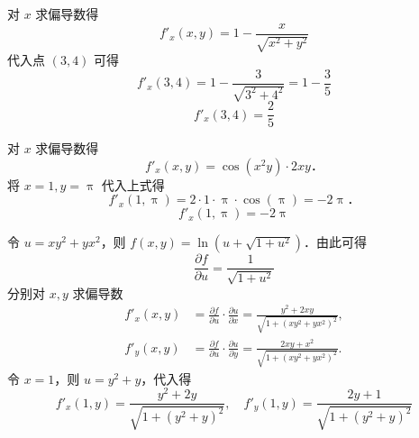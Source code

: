 \begin{solution}

    对 $x$ 求偏导数得
    \begin{equation}
        f'_x(x, y) = 1 - \frac{x}{\sqrt{x^2 + y^2}}
    \end{equation}
    代入点 $(3,4)$ 可得
    \begin{equation}
        f'_x(3,4) = 1 - \frac{3}{\sqrt{3^2 + 4^2}} = 1 - \frac{3}{5}
    \end{equation}
    \begin{equation}
        \boxed{f'_x(3,4) = \frac{2}{5}}
    \end{equation}


    对 $x$ 求偏导数得
    \begin{equation}
        f'_x(x, y) = \cos(x^2 y) \cdot 2xy．
    \end{equation}
    将 $x=1, y=\uppi$ 代入上式得
    \begin{equation}
        f'_x(1, \uppi) = 2 \cdot 1 \cdot \uppi \cdot \cos(\uppi) = -2\uppi．
    \end{equation}
    \begin{equation}
        \boxed{f'_x(1, \uppi) = -2\uppi}
    \end{equation}


    令 $u = xy^2 + yx^2$，则 $f(x,y) = \ln(u + \sqrt{1 + u^2})$．由此可得
    \begin{equation}
        \frac{\partial f}{\partial u} = \frac{1}{\sqrt{1 + u^2}}
    \end{equation}
    分别对 $x, y$ 求偏导数
    \begin{equation}
        \begin{aligned}
            f'_x(x, y) & = \frac{\partial f}{\partial u} \cdot \frac{\partial u}{\partial x} = \frac{y^2 + 2xy}{\sqrt{1 + (xy^2 + yx^2)^2}}, \\
            f'_y(x, y) & = \frac{\partial f}{\partial u} \cdot \frac{\partial u}{\partial y} = \frac{2xy + x^2}{\sqrt{1 + (xy^2 + yx^2)^2}}.
        \end{aligned}
    \end{equation}
    令 $x=1$，则 $u = y^2 + y$，代入得
    \begin{equation}
        \boxed{f'_x(1, y) = \frac{y^2 + 2y}{\sqrt{1 + (y^2 + y)^2}}, \quad f'_y(1, y) = \frac{2y + 1}{\sqrt{1 + (y^2 + y)^2}}}
    \end{equation}
\end{solution}


